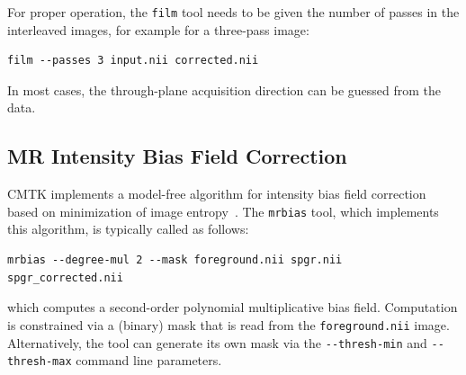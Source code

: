 \documentclass{InsightArticle}
\begin{document}
For proper operation, the \verb|film| tool needs to be given the number of
passes in the interleaved images, for example for a three-pass image:
\begin{verbatim}
film --passes 3 input.nii corrected.nii
\end{verbatim}
In most cases, the through-plane acquisition direction can be guessed from the
data.

\subsection{MR Intensity Bias Field Correction}

CMTK implements a model-free algorithm for intensity bias field correction
based on minimization of image entropy~\cite{LikaVierPern:2001}. The
\verb|mrbias| tool, 
which implements this algorithm, is typically called as
follows:
\begin{verbatim}
mrbias --degree-mul 2 --mask foreground.nii spgr.nii spgr_corrected.nii
\end{verbatim}
which computes a second-order polynomial multiplicative bias
field. Computation is constrained via a (binary) mask that is read from the
\verb|foreground.nii| image. Alternatively, the tool can generate its own mask
via the \verb|--thresh-min| and  \verb|--thresh-max| command line parameters.
\end{document}
